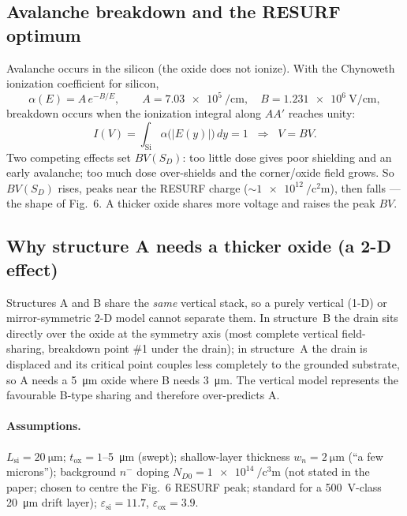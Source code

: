 \documentclass[11pt]{article}
\newcommand{\eox}{\varepsilon_{\mathrm{ox}}}
\newcommand{\esi}{\varepsilon_{\mathrm{si}}}
\newcommand{\SD}{S_{D}}
\newcommand{\tox}{t_{\mathrm{ox}}}
\begin{document}
\subsection{Avalanche breakdown and the RESURF optimum}
Avalanche occurs in the silicon (the oxide does not ionize). With the Chynoweth
ionization coefficient for silicon,
\begin{equation}
\alpha(E) = A\,e^{-B/E},\qquad
A = \SI{7.03e5}{\per\centi\meter},\quad
B = \SI{1.231e6}{\volt\per\centi\meter},
\end{equation}
breakdown occurs when the ionization integral along $AA'$ reaches unity:
\begin{equation}
I(V) = \int_{\mathrm{Si}} \alpha\big(|E(y)|\big)\,dy = 1
\;\;\Longrightarrow\;\; V = BV.
\end{equation}
Two competing effects set $BV(\SD)$: too little dose gives poor shielding and an
early avalanche; too much dose over-shields and the corner/oxide field grows. So
$BV(\SD)$ rises, peaks near the RESURF charge ($\sim\!\SI{1e12}{\per\square\centi\meter}$),
then falls --- the shape of Fig.~6. A thicker oxide shares more voltage and raises
the peak $BV$.

\subsection{Why structure A needs a thicker oxide (a 2-D effect)}
Structures A and B share the \emph{same} vertical stack, so a purely vertical
(1-D) or mirror-symmetric 2-D model cannot separate them. In structure~B the drain
sits directly over the oxide at the symmetry axis (most complete vertical
field-sharing, breakdown point \#1 under the drain); in structure~A the drain is
displaced and its critical point couples less completely to the grounded
substrate, so A needs a \SI{5}{\micro\meter} oxide where B needs
\SI{3}{\micro\meter}. The vertical model represents the favourable B-type sharing
and therefore over-predicts A.

\paragraph{Assumptions.}
$L_{\mathrm{si}}=\SI{20}{\micro\meter}$; $\tox=1$--\SI{5}{\micro\meter} (swept);
shallow-layer thickness $w_n=\SI{2}{\micro\meter}$ (``a few microns''); background
$n^-$ doping $N_{D0}=\SI{1e14}{\per\cubic\centi\meter}$ (not stated in the paper;
chosen to centre the Fig.~6 RESURF peak; standard for a \SI{500}{\volt}-class
\SI{20}{\micro\meter} drift layer); $\esi=11.7$, $\eox=3.9$.
\end{document}

